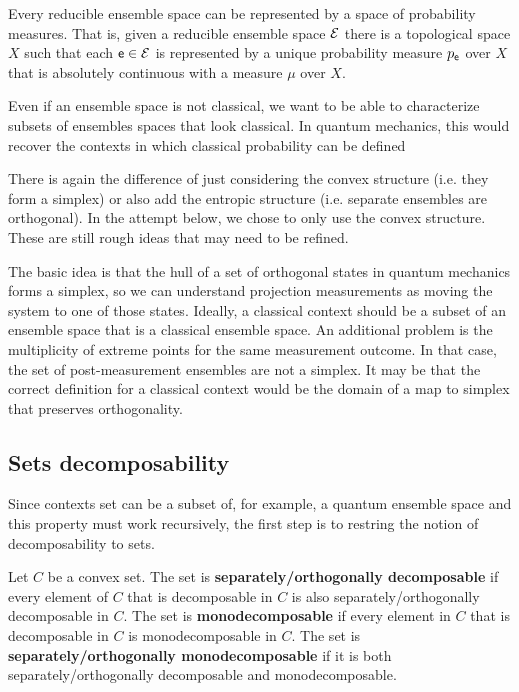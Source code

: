 \begin{conj}
	Every reducible ensemble space can be represented by a space of probability measures. That is, given a reducible ensemble space $\mathcal{E}$ there is a topological space $X$ such that each $\mathsf{e} \in \mathcal{E}$ is represented by a unique probability measure $p_{\mathsf{e}}$ over $X$ that is absolutely continuous with a measure $\mu$ over $X$.
\end{conj}


{Even if an ensemble space is not classical, we want to be able to characterize subsets of ensembles spaces that look classical. In quantum mechanics, this would recover the contexts in which classical probability can be defined}

There is again the difference of just considering the convex structure (i.e. they form a simplex) or also add the entropic structure (i.e. separate ensembles are orthogonal). In the attempt below, we chose to only use the convex structure. These are still rough ideas that may need to be refined.

The basic idea is that the hull of a set of orthogonal states in quantum mechanics forms a simplex, so we can understand projection measurements as moving the system to one of those states. Ideally, a classical context should be a subset of an ensemble space that is a classical ensemble space. An additional problem is the multiplicity of extreme points for the same measurement outcome. In that case, the set of post-measurement ensembles are not a simplex. It may be that the correct definition for a classical context would be the domain of a map to simplex that preserves orthogonality.


\subsection{Sets decomposability}

Since contexts set can be a subset of, for example, a quantum ensemble space and this property must work recursively, the first step is to restring the notion of decomposability to sets.

\begin{defn}
	Let $C$ be a convex set. The set is \textbf{separately/orthogonally decomposable} if every element of $C$ that is decomposable in $C$ is also separately/orthogonally decomposable in $C$. The set is \textbf{monodecomposable} if every element in $C$ that is decomposable in $C$ is monodecomposable in $C$. The set is \textbf{separately/orthogonally monodecomposable} if it is both separately/orthogonally decomposable and monodecomposable.
\end{defn}

